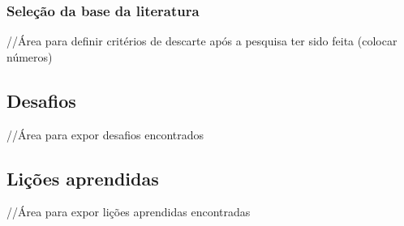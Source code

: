 \documentclass[a4paper,11pt]{article}
\begin{document}
		\subsubsection{Seleção da base da literatura}
			//Área para definir critérios de descarte após a pesquisa ter sido feita (colocar números)
	\subsection{Desafios}
		//Área para expor desafios encontrados
	\subsection{Lições aprendidas}
		//Área para expor lições aprendidas encontradas

\newpage


\end{document}
